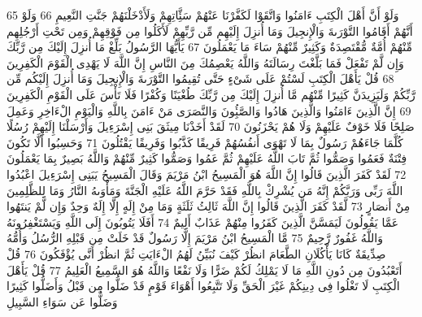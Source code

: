 {\tiny\colorbox{cl_aya}{65}} وَلَوْ أَنَّ أَهْلَ الْكِتَبِ ءَامَنُوا وَاتَّقَوْا لَكَفَّرْنَا عَنْهُمْ سَئَِّاتِهِمْ وَلَأَدْخَلْنَهُمْ جَنَّتِ النَّعِيمِ
{\tiny\colorbox{cl_aya}{66}} وَلَوْ أَنَّهُمْ أَقَامُوا التَّوْرَىةَ وَالْإِنجِيلَ وَمَا أُنزِلَ إِلَيْهِم مِّن رَّبِّهِمْ لَأَكَلُوا مِن فَوْقِهِمْ وَمِن تَحْتِ أَرْجُلِهِم مِّنْهُمْ أُمَّةٌ مُّقْتَصِدَةٌ وَكَثِيرٌ مِّنْهُمْ سَاءَ مَا يَعْمَلُونَ
{\tiny\colorbox{cl_aya}{67}} يَأَيُّهَا الرَّسُولُ بَلِّغْ مَا أُنزِلَ إِلَيْكَ مِن رَّبِّكَ وَإِن لَّمْ تَفْعَلْ فَمَا بَلَّغْتَ رِسَالَتَهُ وَاللَّهُ يَعْصِمُكَ مِنَ النَّاسِ إِنَّ اللَّهَ لَا يَهْدِى الْقَوْمَ الْكَفِرِينَ
{\tiny\colorbox{cl_aya}{68}} قُلْ يَأَهْلَ الْكِتَبِ لَسْتُمْ عَلَى شَىْءٍ حَتَّى تُقِيمُوا التَّوْرَىةَ وَالْإِنجِيلَ وَمَا أُنزِلَ إِلَيْكُم مِّن رَّبِّكُمْ وَلَيَزِيدَنَّ كَثِيرًا مِّنْهُم مَّا أُنزِلَ إِلَيْكَ مِن رَّبِّكَ طُغْيَنًا وَكُفْرًا فَلَا تَأْسَ عَلَى الْقَوْمِ الْكَفِرِينَ
{\tiny\colorbox{cl_aya}{69}} إِنَّ الَّذِينَ ءَامَنُوا وَالَّذِينَ هَادُوا وَالصَّبُِٔونَ وَالنَّصَرَى مَنْ ءَامَنَ بِاللَّهِ وَالْيَوْمِ الْءَاخِرِ وَعَمِلَ صَلِحًا فَلَا خَوْفٌ عَلَيْهِمْ وَلَا هُمْ يَحْزَنُونَ
{\tiny\colorbox{cl_aya}{70}} لَقَدْ أَخَذْنَا مِيثَقَ بَنِى إِسْرَءِيلَ وَأَرْسَلْنَا إِلَيْهِمْ رُسُلًا كُلَّمَا جَاءَهُمْ رَسُولٌ بِمَا لَا تَهْوَى أَنفُسُهُمْ فَرِيقًا كَذَّبُوا وَفَرِيقًا يَقْتُلُونَ
{\tiny\colorbox{cl_aya}{71}} وَحَسِبُوا أَلَّا تَكُونَ فِتْنَةٌ فَعَمُوا وَصَمُّوا ثُمَّ تَابَ اللَّهُ عَلَيْهِمْ ثُمَّ عَمُوا وَصَمُّوا كَثِيرٌ مِّنْهُمْ وَاللَّهُ بَصِيرٌ بِمَا يَعْمَلُونَ
{\tiny\colorbox{cl_aya}{72}} لَقَدْ كَفَرَ الَّذِينَ قَالُوا إِنَّ اللَّهَ هُوَ الْمَسِيحُ ابْنُ مَرْيَمَ وَقَالَ الْمَسِيحُ يَبَنِى إِسْرَءِيلَ اعْبُدُوا اللَّهَ رَبِّى وَرَبَّكُمْ إِنَّهُ مَن يُشْرِكْ بِاللَّهِ فَقَدْ حَرَّمَ اللَّهُ عَلَيْهِ الْجَنَّةَ وَمَأْوَىهُ النَّارُ وَمَا لِلظَّلِمِينَ مِنْ أَنصَارٍ
{\tiny\colorbox{cl_aya}{73}} لَّقَدْ كَفَرَ الَّذِينَ قَالُوا إِنَّ اللَّهَ ثَالِثُ ثَلَثَةٍ وَمَا مِنْ إِلَهٍ إِلَّا إِلَهٌ وَحِدٌ وَإِن لَّمْ يَنتَهُوا عَمَّا يَقُولُونَ لَيَمَسَّنَّ الَّذِينَ كَفَرُوا مِنْهُمْ عَذَابٌ أَلِيمٌ
{\tiny\colorbox{cl_aya}{74}} أَفَلَا يَتُوبُونَ إِلَى اللَّهِ وَيَسْتَغْفِرُونَهُ وَاللَّهُ غَفُورٌ رَّحِيمٌ
{\tiny\colorbox{cl_aya}{75}} مَّا الْمَسِيحُ ابْنُ مَرْيَمَ إِلَّا رَسُولٌ قَدْ خَلَتْ مِن قَبْلِهِ الرُّسُلُ وَأُمُّهُ صِدِّيقَةٌ كَانَا يَأْكُلَانِ الطَّعَامَ انظُرْ كَيْفَ نُبَيِّنُ لَهُمُ الْءَايَتِ ثُمَّ انظُرْ أَنَّى يُؤْفَكُونَ
{\tiny\colorbox{cl_aya}{76}} قُلْ أَتَعْبُدُونَ مِن دُونِ اللَّهِ مَا لَا يَمْلِكُ لَكُمْ ضَرًّا وَلَا نَفْعًا وَاللَّهُ هُوَ السَّمِيعُ الْعَلِيمُ
{\tiny\colorbox{cl_aya}{77}} قُلْ يَأَهْلَ الْكِتَبِ لَا تَغْلُوا فِى دِينِكُمْ غَيْرَ الْحَقِّ وَلَا تَتَّبِعُوا أَهْوَاءَ قَوْمٍ قَدْ ضَلُّوا مِن قَبْلُ وَأَضَلُّوا كَثِيرًا وَضَلُّوا عَن سَوَاءِ السَّبِيلِ

